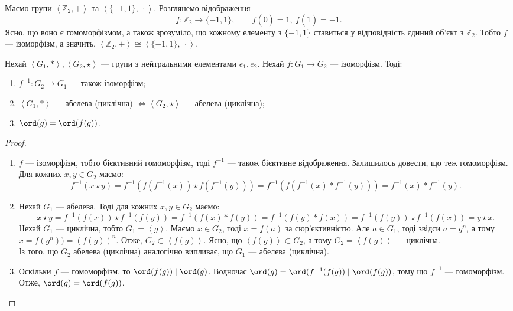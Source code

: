 \documentclass{math_library}
\begin{document}
\begin{example}
Маємо групи $\left<\mathbb{Z}_2,+ \right>$ та $\left< \{-1,1\},\ \cdot \right>$. Розглянемо відображення \[ 
f \colon \mathbb{Z}_2 \to \{-1,1\}, \qquad f(\overline{0}) = 1,\ f(\overline{1}) = -1.
\]
Ясно, що воно є гомоморфізмом, а також зрозуміло, що кожному елементу з $\{-1,1\}$ ставиться у відповідність єдиний об'єкт з $\mathbb{Z}_2$.  Тобто $f$ --- ізоморфізм, а значить, $\left<\mathbb{Z}_2,+ \right> \cong \left<\{-1,1\},\ \cdot \right>$.
\end{example}

\begin{theorem}
Нехай $\left<G_1, *\right>, \left<G_2, \star \right>$ --- групи з нейтральними елементами $e_1,e_2$. Нехай $f \colon G_1 \to G_2$ --- ізоморфізм. Тоді:
\begin{enumerate}[nosep,wide=0pt,label={\arabic*)}]
\item $f^{-1} \colon G_2 \to G_1$ --- також ізоморфізм;
\item $\left< G_1, * \right>$ --- абелева (циклічна) $\iff \left< G_2, \star \right>$ --- абелева (циклічна);
\item $\ord(g) = \ord(f(g))$.
\end{enumerate}
\end{theorem}

\begin{proof}
\begin{enumerate}[topsep=0pt,wide=0pt,label={\arabic*)}]
\item $f$ --- ізоморфізм, тобто бієктивний гомоморфізм, тоді $f^{-1}$ --- також бієктивне відображення. Залишилось довести, що теж гомоморфізм. Для кожних $x,y \in G_2$ маємо:
\[
f^{-1}(x \star y) = f^{-1}(f(f^{-1}(x)) \star f(f^{-1}(y)))  = f^{-1}(f(f^{-1}(x)*f^{-1}(y))) = f^{-1}(x)*f^{-1}(y).
\]

\item Нехай $G_1$ --- абелева. Тоді для кожних $x,y \in G_2$ маємо:
\[
x \star y = f^{-1}(f(x)) \star f^{-1}(f(y)) = f^{-1}(f(x) * f(y)) = f^{-1}(f(y) * f(x)) = f^{-1}(f(y)) \star f^{-1}(f(x)) = y \star x.
\]
Нехай $G_1$ --- циклічна, тобто $G_1 = \left<g\right>$. Маємо $x \in G_2$, тоді $x = f(a)$ за сюр'єктивністю. Але $a \in G_1$, тоді звідси $a = g^n$, а тому $x = f(g^n)) = (f(g))^n$. Отже, $G_2 \subset \left<f(g)\right>$. Ясно, що $\left<f(g)\right> \subset G_2$, а тому $G_2 = \left<f(g)\right>$ --- циклічна.\\
Із того, що $G_2$ абелева (циклічна) аналогічно випливає, що $G_1$ --- абелева (циклічна).

\item Оскільки $f$ --- гомоморфізм, то $\ord(f(g)) \mid \ord(g)$. Водночас $\ord(g) = \ord(f^{-1}(f(g)) \mid \ord(f(g))$, тому що $f^{-1}$ --- гомоморфізм. Отже, $\ord(g) = \ord(f(g))$. \qedhere
\end{enumerate}
\end{proof}
\end{document}
